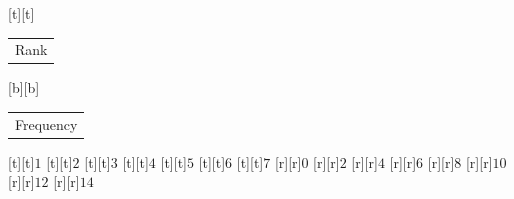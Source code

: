 %    
%
%
\begin{psfrags}%
\psfragscanon%
%
[t][t]{\color[rgb]{0,0,0}\setlength{\tabcolsep}{0pt}\begin{tabular}{c}\Large{}Rank\end{tabular}}%
[b][b]{\color[rgb]{0,0,0}\setlength{\tabcolsep}{0pt}\begin{tabular}{c}\Large{}Frequency\end{tabular}}%
%
[t][t]{$1$}%
[t][t]{$2$}%
[t][t]{$3$}%
[t][t]{$4$}%
[t][t]{$5$}%
[t][t]{$6$}%
[t][t]{$7$}%
%
[r][r]{$0$}%
[r][r]{$2$}%
[r][r]{$4$}%
[r][r]{$6$}%
[r][r]{$8$}%
[r][r]{$10$}%
[r][r]{$12$}%
[r][r]{$14$}%
%
%
\end{psfrags}%
%
